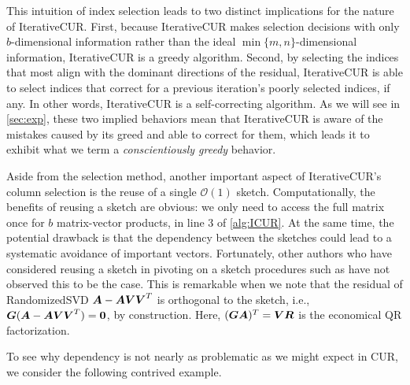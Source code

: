 This intuition of index selection leads to two distinct implications for the nature of IterativeCUR. First, because IterativeCUR makes selection decisions with only $b$-dimensional information rather than the ideal $\min\{m,n\}$-dimensional information, IterativeCUR is a greedy algorithm.  Second, by selecting the indices that most align with the dominant directions of the residual, IterativeCUR is able to select indices that correct for a previous iteration's poorly selected indices, if any. In other words, IterativeCUR is a self-correcting algorithm. As we will see in \cref{sec:exp}, these two implied behaviors mean that IterativeCUR is aware of the mistakes caused by its greed and able to correct for them, which leads it to exhibit what we term a \textit{conscientiously greedy} behavior. 

Aside from the selection method, another important aspect of IterativeCUR's column selection is the reuse of a single $\mathcal{O}(1)$ sketch. Computationally, the benefits of reusing a sketch are obvious: we only need to access the full matrix once for $b$ matrix-vector products, in line 3 of \cref{alg:ICUR}.  At the same time, the potential drawback is that the dependency between the sketches could lead to a systematic avoidance of important vectors. Fortunately, other authors who have considered reusing a sketch in pivoting on a sketch procedures such as \cite{chen2020efficient, martinsson2017householder} have not observed this to be the case. This is remarkable when we note that the residual of RandomizedSVD $\boldsymbol{A}-\boldsymbol{AVV}^T$ is orthogonal to the sketch, i.e., $\boldsymbol{G}(\boldsymbol{A}-\boldsymbol{AVV}^T)=\boldsymbol{0}$, by construction. Here, $(\boldsymbol{GA})^T=\boldsymbol{VR}$ is the economical QR factorization. 

To see why dependency is not nearly as problematic as we might expect in CUR, we consider the following contrived example.


